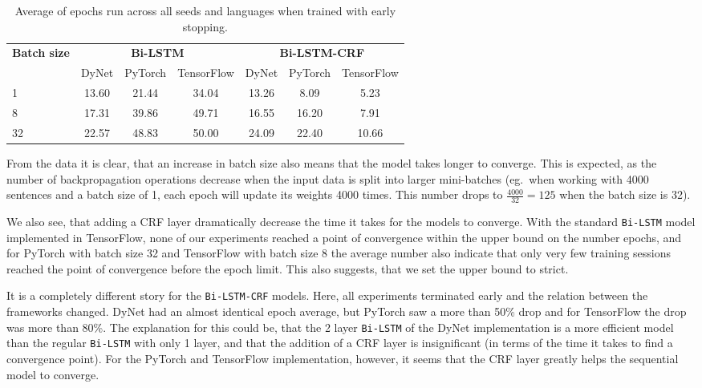 \begin{table}[h!]
    \centering
    \begin{tabular}{l c c c|c c c}
        \toprule
        \multirow{2}{*}{\bfseries Batch size}     &
        \multicolumn{3}{c}{\bfseries Bi-LSTM}     &
        \multicolumn{3}{c}{\bfseries Bi-LSTM-CRF} \\
        \cmidrule(lr){2-7}
        & DyNet & PyTorch & TensorFlow
        & DyNet & PyTorch & TensorFlow \\
        \cmidrule(lr){1-7}
         1 & 13.60 & 21.44 & 34.04 & 13.26 &  8.09 &  5.23 \\
         8 & 17.31 & 39.86 & 49.71 & 16.55 & 16.20 &  7.91 \\
        32 & 22.57 & 48.83 & 50.00 & 24.09 & 22.40 & 10.66 \\
        \bottomrule
    \end{tabular}
    \caption{Average of epochs run across all seeds and languages when trained
        with early stopping.
    }\label{table:epochs-run-pos}
\end{table}

From the data it is clear, that an increase in batch size also means that the
model takes longer to converge. This is expected, as the number of
backpropagation operations decrease when the input data is split into larger
mini-batches (eg.\ when working with 4000 sentences and a batch size of 1, each
epoch will update its weights 4000 times. This number drops to
$\frac{4000}{32}=125$ when the batch size is 32).

We also see, that adding a CRF layer dramatically decrease the time it takes for
the models to converge. With the standard \texttt{Bi-LSTM} model implemented in
TensorFlow, none of our experiments reached a point of convergence within the
upper bound on the number epochs, and for PyTorch with batch size 32 and
TensorFlow with batch size 8 the average number also indicate that only very few
training sessions reached the point of convergence before the epoch limit. This
also suggests, that we set the upper bound to strict.

It is a completely different story for the \texttt{Bi-LSTM-CRF} models. Here,
all experiments terminated early and the relation between the frameworks
changed.  DyNet had an almost identical epoch average, but PyTorch saw a more
than 50\% drop and for TensorFlow the drop was more than 80\%. The explanation
for this could be, that the 2 layer \texttt{Bi-LSTM} of the DyNet implementation
is a more efficient model than the regular \texttt{Bi-LSTM} with only 1 layer,
and that the addition of a CRF layer is insignificant (in terms of the time it
takes to find a convergence point). For the PyTorch and TensorFlow
implementation, however, it seems that the CRF layer greatly helps the
sequential model to converge.

